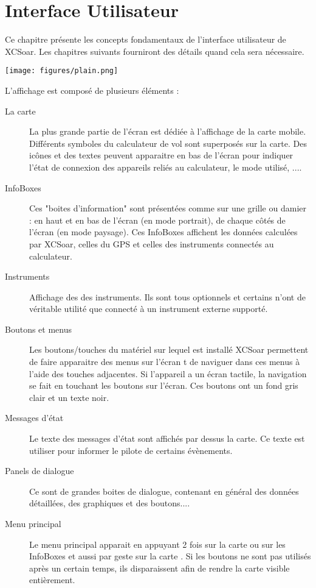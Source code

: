 \chapter{Interface Utilisateur}\label{cha:interface}
Ce chapitre présente les concepts fondamentaux de l'interface utilisateur de XCSoar. Les chapitres suivants fourniront des détails quand cela sera nécessaire.

\begin{center}
\texttt{[image: figures/plain.png]}
\end{center}

L'affichage est composé de plusieurs éléments :
\begin{description}
\item[La carte] La plus grande partie de l'écran est dédiée à l'affichage de la carte mobile. Différents symboles du calculateur de vol sont superposés sur la carte. Des icônes et des textes peuvent apparaitre en bas de l'écran pour indiquer l'état de connexion des appareils reliés au calculateur, le mode utilisé, ....
\item[InfoBoxes] Ces "boites d'information" sont présentées comme sur une grille ou damier : en haut et en bas de l'écran (en mode portrait), de chaque côtés de l'écran (en mode paysage). Ces InfoBoxes affichent les données calculées par XCSoar, celles du GPS et celles des instruments connectés au calculateur.
\item[Instruments]  Affichage des des instruments. Ils sont tous optionnels et certains n'ont de véritable utilité que connecté à un instrument externe supporté.
\item[Boutons et menus] Les boutons/touches du matériel sur lequel est installé XCSoar permettent de faire apparaitre des menus sur l'écran t de naviguer dans ces menus à l'aide des touches adjacentes. Si l'appareil a un écran tactile, la navigation se fait en touchant les boutons sur l'écran. Ces boutons ont un fond gris clair et un texte noir.
\item[Messages d'état] Le texte des messages d'état sont affichés par dessus la carte. Ce texte est utiliser pour informer le pilote de certains évènements.
\item[Panels de dialogue] Ce sont de grandes boites de dialogue, contenant en général des données détaillées, des graphiques et des boutons....
\item[Menu principal] Le menu principal apparait en appuyant 2 fois sur la carte ou sur les InfoBoxes et aussi par geste sur la carte . Si les boutons ne sont pas utilisés après un certain temps, ils disparaissent afin de rendre la carte visible entièrement.
\end{description}

